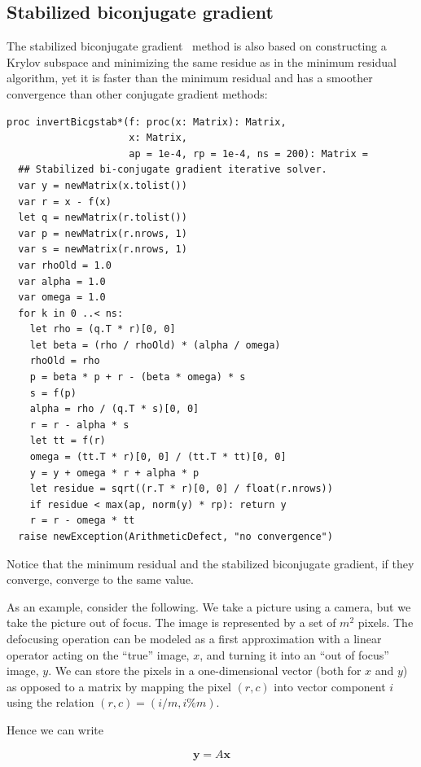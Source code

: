 \documentclass[justified, sixbynine]{tufte-book}
\def\ft{\small\tt}
\theoremstyle{plain}%
\newtheorem * {corollary}{Corollary}
\theoremstyle{definition}
\theoremstyle{remark}
\newtheorem * {remark}{Remark}
\newtheorem * {note}{Note}
\begin{document}
\begin{fullwidth}
\goodbreak\subsection{Stabilized biconjugate gradient}


The stabilized biconjugate gradient~\cite{bicgstab} method is also based on constructing a Krylov subspace and minimizing the same residue as in the minimum residual algorithm, yet it is faster than the minimum residual and has a smoother convergence than other conjugate gradient methods:

\begin{lstlisting}[caption={in file: {\ft nlib/linalg.nim}}]
proc invertBicgstab*(f: proc(x: Matrix): Matrix,
                     x: Matrix,
                     ap = 1e-4, rp = 1e-4, ns = 200): Matrix =
  ## Stabilized bi-conjugate gradient iterative solver.
  var y = newMatrix(x.tolist())
  var r = x - f(x)
  let q = newMatrix(r.tolist())
  var p = newMatrix(r.nrows, 1)
  var s = newMatrix(r.nrows, 1)
  var rhoOld = 1.0
  var alpha = 1.0
  var omega = 1.0
  for k in 0 ..< ns:
    let rho = (q.T * r)[0, 0]
    let beta = (rho / rhoOld) * (alpha / omega)
    rhoOld = rho
    p = beta * p + r - (beta * omega) * s
    s = f(p)
    alpha = rho / (q.T * s)[0, 0]
    r = r - alpha * s
    let tt = f(r)
    omega = (tt.T * r)[0, 0] / (tt.T * tt)[0, 0]
    y = y + omega * r + alpha * p
    let residue = sqrt((r.T * r)[0, 0] / float(r.nrows))
    if residue < max(ap, norm(y) * rp): return y
    r = r - omega * tt
  raise newException(ArithmeticDefect, "no convergence")
\end{lstlisting}

Notice that the minimum residual and the stabilized biconjugate gradient, if they converge, converge to the same value.

As an example, consider the following. We take a picture using a camera, but we take the picture out of focus. The image is represented by a set of $m^2$ pixels. The defocusing operation can be modeled as a first approximation with a linear operator acting on the ``true'' image, $x$, and turning it into an ``out of focus'' image, $y$. We can store the pixels in a one-dimensional vector (both for $x$ and $y$) as opposed to a matrix by mapping the pixel $(r, c)$ into vector component $i$ using the relation $(r, c) = (i/m, i\%m)$.

Hence we can write

\begin{equation}
\mathbf{y} = A \mathbf{x}
\end{equation}


\end{fullwidth}
\end{document}
